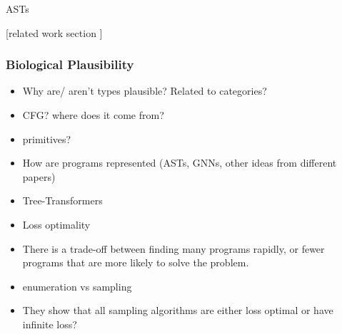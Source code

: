 

\cite{gulwani_program_2017}

ASTs
\cite{oliveira_abstract_2013}
\cite{zhang_novel_2019}



[related work section ]








\subsubsection{Biological Plausibility}
\begin{itemize}
    \item Why are/ aren't types plausible? Related to categories?
    \item CFG? where does it come from?
    \item primitives?
\end{itemize}



\begin{itemize}
    \item How are programs represented (ASTs, GNNs, other ideas from different papers)
    \item Tree-Transformers
\end{itemize}











\begin{itemize}
    \item Loss optimality
    \item There is a trade-off between finding many programs rapidly, or fewer programs that are more likely to solve the problem.
    \item enumeration vs sampling
    \item They show that all sampling algorithms are either loss optimal or have infinite loss?
\end{itemize}











